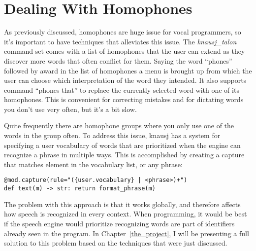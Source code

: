 \documentclass[../thesis.tex]{subfiles}
\begin{document}
\section{Dealing With Homophones}\label{dealing_with_homophones}
As previously discussed, homophones are huge issue for vocal programmers, 
so it's important to have techniques that alleviates this issue.
The \textit{knausj\_talon} command set comes with a list of homophones that the user can extend
as they discover more words that often conflict for them.
Saying the word ``phones'' followed by award in the list of homophones a menu is brought up
from which the user can choose which interpretation of the word they intended.
It also supports command ``phones that'' to replace the currently selected word with one of its homophones.
This is convenient for correcting mistakes and for dictating words you don't use very often, but it's a bit slow.

Quite frequently there are homophone groups where you only use one of the words in the group often.
To address this issue, knausj has a system for specifying a user vocabulary
of words that are prioritized when the engine can recognize a phrase in multiple ways.
This is accomplished by creating a capture that matches element in the vocabulary list, or any phrase:
\begin{verbatim}
@mod.capture(rule="({user.vocabulary} | <phrase>)+")
def text(m) -> str: return format_phrase(m)
\end{verbatim}

The problem with this approach is that it works globally, and therefore affects
how speech is recognized in every context.
When programming, it would be best if the speech engine would prioritize recognizing
words are part of identifiers already seen in the program.
In Chapter~\ref{the_project}, I will be presenting a full solution to this problem
based on the techniques that were just discussed.



\end{document}
